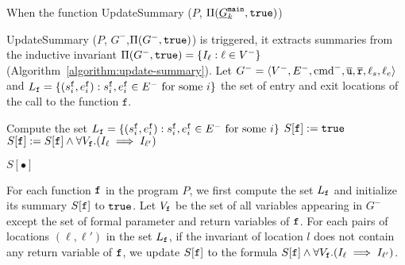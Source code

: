 When the function 
UpdateSummary ($P$, $\Pi (\underline{G}^{\mathtt{{main}}}_k, \mathtt{true})$)

UpdateSummary ($P$, $G^-$,$\Pi (G^-, \mathtt{true})$) is triggered, it extracts summaries from the inductive invariant $\Pi (G^-, \mathtt{true})= \{ I_\ell : \ell \in V^-
\}$ (Algorithm~\ref{algorithm:update-summary}). 
Let $G^- = \langle V^-, E^-, \textmd{cmd}^-, \overline{\mathtt{u}}, \overline{\mathtt{r}},\ell_s,\ell_e \rangle$ and $L_{\mathtt{{f}}}=\{(s_i^{\mathtt{{f}}},e_i^{\mathtt{{f}}}):s_i^{\mathtt{{f}}}, e_i^{\mathtt{{f}}}\in E^-\mbox{ for some }i\}$
the set of entry and exit locations of the call to the function $\mathtt{f}$.

\begin{algorithm}

  {	
  	Compute the set $L_{\mathtt{{f}}}=\{(s_i^{\mathtt{{f}}},e_i^{\mathtt{{f}}}):s_i^{\mathtt{{f}}}, e_i^{\mathtt{{f}}}\in E^-\mbox{ for some }i\}$\;
  	$S[\mathtt{{f}}]:=\mathtt{true}$\;
   	{
       	{
         		$S[\mathtt{{f}}]:=S[\mathtt{{f}}]\wedge \forall V_\mathtt{f}. (I_\ell \implies I_{\ell'})$\;
       	}	
   	}
    
  }
 
  \Return $S[\bullet]$\;
  \caption{$\textmd{UpdateSummary} (P, G^-,\Pi (G^-, \TT))$}
  \label{algorithm:update-summary}
\end{algorithm}

For each function $\mathtt{{f}}$ in the program $P$, we first compute the set $L_{\mathtt{{f}}}$  and initialize its summary $S[\mathtt{{f}}]$ to $\mathtt{true}$.
Let $V_{\mathtt{{f}}}$ be the set of all variables appearing in $G^-$ except the set of formal parameter and return variables of $\mathtt{{f}}$.
For each pairs of locations $(\ell,\ell')$ in the set $L_{\mathtt{{f}}}$, if the invariant of location $l$ does not contain any return variable of $\mathtt{{f}}$, we update $S[\mathtt{{f}}]$ to the formula $S[\mathtt{{f}}]\wedge \forall V_{\mathtt{{f}}}. (I_\ell \implies I_{\ell'})$.


